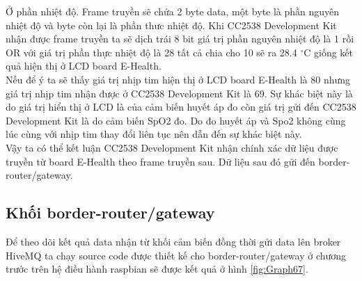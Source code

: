\documentclass{report}
\begin{document}
Ở phần nhiệt độ. Frame truyền sẽ chứa 2 byte data, một byte là phần nguyên nhiệt độ và byte còn lại là phần thưc nhiệt độ. Khi CC2538 Development Kit nhận được frame truyền ta sẽ dịch trái 8 bit giá trị phần nguyên nhiệt độ là 1 rồi OR với giá trị phần thực nhiệt độ là 28 tất cả chia cho 10 sẽ ra 28.4  $^{\circ}$C giống kết quả hiện thị ở LCD board E-Health. \\

Nếu để ý ta sẽ thấy giá trị nhịp tim hiện thị ở LCD board E-Health là 80 nhưng giá trị nhịp tim nhận được ở CC2538 Development Kit là 69. Sự khác biệt này là do giá trị hiển thị ở LCD là của cảm biến huyết áp đo còn giá trị gửi đến CC2538 Development Kit là do cảm biến SpO2 đo. Do đo huyết áp và Spo2 không cùng lúc cùng với nhịp tim thay đổi liên tục nên dẫn đến sự khác biệt này. \\

Vậy ta có thể kết luận CC2538 Development Kit nhận chính xác dữ liệu được truyền từ board E-Health theo frame truyền sau. Dữ liệu sau đó gửi đến border-router/gateway.


\newpage
\subsection{Khối border-router/gateway}
Để theo dõi kết quả data nhận từ khối cảm biến đồng thời gửi data lên broker HiveMQ ta chạy source code được thiết kế cho border-router/gateway ở chương trước trên hệ điều hành raspbian sẽ được kết quả ở hình \ref{fig:Graph67}.
\end{document}
